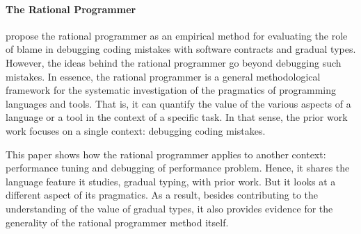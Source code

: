 \paragraph{The Rational Programmer}

 \citet{lksfd-popl-2020,lgfd-icfp-2021} propose the rational programmer as
 an empirical method for evaluating the role of blame in debugging coding
 mistakes with software contracts and gradual types. However, the ideas
 behind the rational programmer go beyond debugging such mistakes. In
 essence, the rational programmer is a general methodological framework
 for the systematic investigation of the pragmatics of programming
 languages and tools. That is, it can quantify the value of the various
 aspects of a language or a tool in the context of a specific task. In
 that sense, the prior work work focuses on a single context: debugging
 coding mistakes.

 This paper shows how the rational programmer applies
 to another context: performance tuning and debugging of performance
 problem. Hence, it shares the language feature it studies, gradual
 typing, with prior work. But it looks at a different aspect
 of its pragmatics. As a result, besides contributing to the understanding
 of the value of gradual types, it also provides evidence for the
 generality of the rational programmer method itself.


